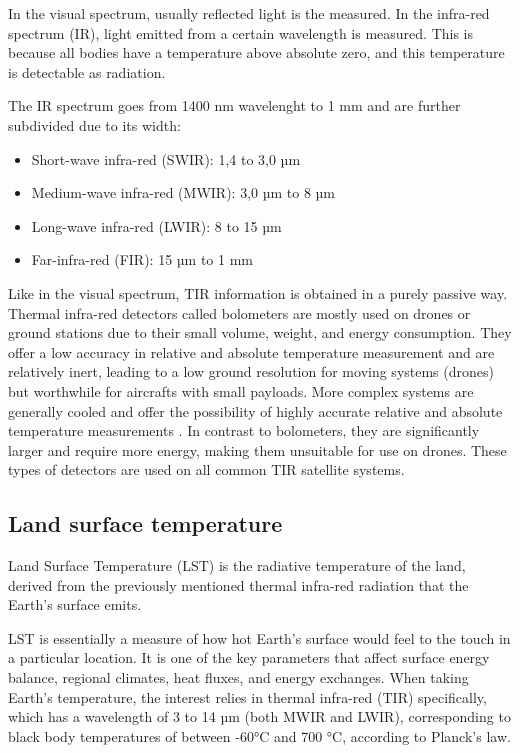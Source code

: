     In the visual spectrum, usually reflected light is the measured. 
    In the infra-red spectrum (IR), light emitted from a certain wavelength is measured.
    This is because all bodies have a temperature above absolute zero, and this temperature is detectable as radiation.

    The IR spectrum goes from 1400 nm wavelenght to 1 mm and are further subdivided due to its width:


    \begin{itemize}
        \item  Short-wave infra-red (SWIR): 1,4 to 3,0 µm
        \item  Medium-wave infra-red (MWIR): 3,0 µm to 8 µm
        \item Long-wave infra-red (LWIR): 8 to 15 µm
        \item Far-infra-red (FIR): 15 µm to 1 mm
    \end{itemize}
    
    Like in the visual spectrum, TIR information is obtained in a purely passive way.
    Thermal infra-red detectors called bolometers are mostly used on drones or ground stations due to their small volume, weight, and energy consumption. 
    They offer a low accuracy in relative and absolute temperature measurement and are relatively inert, leading to a low ground resolution for moving systems (drones) but worthwhile for aircrafts with small payloads.     
    More complex systems are generally cooled and offer the possibility of highly accurate relative and absolute temperature measurements .
    In contrast to bolometers, they are significantly larger and require more energy, making them unsuitable for use on drones.
    These types of detectors are used on all common TIR satellite systems.

    \subsection{Land surface temperature}


        Land Surface Temperature (LST) is the radiative temperature of the land, derived from the previously mentioned thermal infra-red radiation that the Earth’s surface emits.

        LST is essentially a measure of how hot Earth's surface would feel to the touch in a particular location.
        It is one of the key parameters that affect surface energy balance, regional climates, heat fluxes, and energy exchanges.
        When taking Earth’s temperature, the interest relies in thermal infra-red (TIR) specifically, which has a wavelength of 3 to 14 µm (both MWIR and LWIR), corresponding to black body temperatures of between -60°C and 700 °C, according to Planck’s law.

